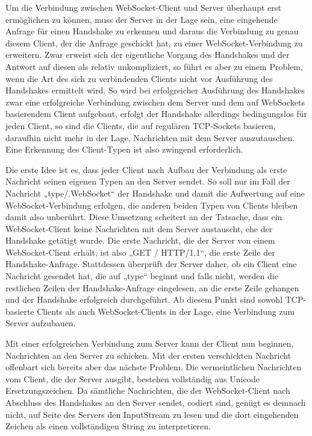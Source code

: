 \documentclass[12pt, onecolumn,notitlepage]{scrartcl}
\begin{document}
Um die Verbindung zwischen WebSocket-Client und Server überhaupt erst ermöglichen zu können, muss der Server in der Lage sein, eine eingehende Anfrage für einen Handshake zu erkennen und daraus die Verbindung zu genau diesem Client, der die Anfrage geschickt hat, zu einer WebSocket-Verbindung zu erweitern. Zwar erweist sich der eigentliche Vorgang des Handshakes und der Antwort auf diesen als relativ unkompliziert, so führt es aber zu einem Problem, wenn die Art des sich zu verbindenden Clients nicht vor Ausführung des Handshakes ermittelt wird. So wird bei erfolgreicher Ausführung des Handshakes zwar eine erfolgreiche Verbindung zwischen dem Server und dem auf WebSockets basierendem Client aufgebaut, erfolgt der Handshake allerdings bedingungslos für jeden Client, so sind die Clients, die auf regulären TCP-Sockets basieren, daraufhin nicht mehr in der Lage, Nachrichten mit dem Server auszutauschen. Eine Erkennung des Client-Typen ist also zwingend erforderlich. \par

Die erste Idee ist es, dass jeder Client nach Aufbau der Verbindung als erste Nachricht seinen eigenen Typen an den Server sendet. So soll nur im Fall der Nachricht „type/.WebSocket“ der Handshake und damit die Aufwertung auf eine WebSocket-Verbindung erfolgen, die anderen beiden Typen von Clients bleiben damit also unberührt. Diese Umsetzung scheitert an der Tatsache, dass ein WebSocket-Client keine Nachrichten mit dem Server austauscht, ehe der Handshake getätigt wurde. Die erste Nachricht, die der Server von einem WebSocket-Client erhält, ist also „GET / HTTP/1.1“, die erste Zeile der Handshake-Anfrage. Stattdessen überprüft der Server daher, ob ein Client eine Nachricht gesendet hat, die auf „type“ beginnt und falls nicht, werden die restlichen Zeilen der Handshake-Anfrage eingelesen,  an die erste Zeile gehangen und der Handshake erfolgreich durchgeführt. Ab diesem Punkt sind sowohl TCP-basierte Clients als auch WebSocket-Clients in der Lage, eine Verbindung zum Server aufzubauen. \par

Mit einer erfolgreichen Verbindung zum Server kann der Client nun beginnen, Nachrichten an den Server zu schicken. Mit der ersten verschickten Nachricht offenbart sich bereits aber das nächste Problem. Die vermeintlichen Nachrichten vom Client, die der Server ausgibt, bestehen vollständig aus Unicode Ersetzungszeichen. Da sämtliche Nachrichten, die der WebSocket-Client nach Abschluss des Handshakes an den Server sendet, codiert sind, genügt es demnach nicht, auf Seite des Servers den InputStream zu lesen und die dort eingehenden Zeichen als einen vollständigen String zu interpretieren. \par
\end{document}
